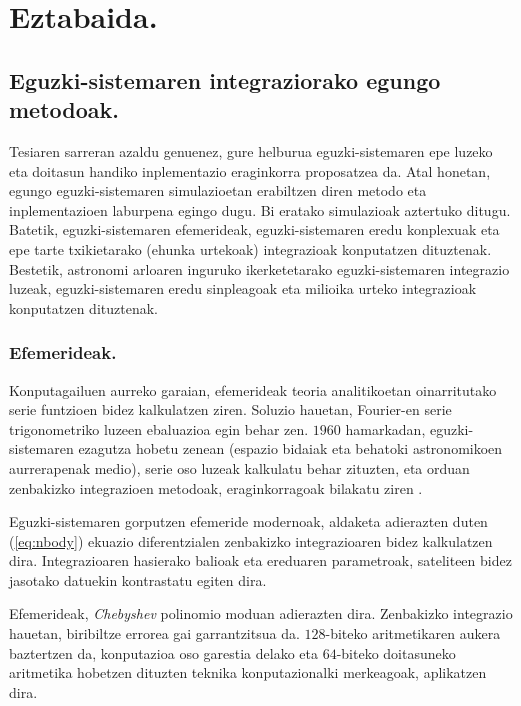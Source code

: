 \chapter{Eztabaida.}

\section{Eguzki-sistemaren integraziorako egungo metodoak.}


Tesiaren sarreran azaldu genuenez, gure helburua eguzki-sistemaren epe luzeko eta doitasun handiko inplementazio eraginkorra proposatzea da. Atal honetan, egungo eguzki-sistemaren simulazioetan erabiltzen diren metodo eta inplementazioen laburpena egingo dugu. Bi eratako simulazioak aztertuko ditugu. Batetik, eguzki-sistemaren  efemerideak, eguzki-sistemaren eredu konplexuak eta epe tarte txikietarako (ehunka urtekoak) integrazioak konputatzen dituztenak. Bestetik, astronomi arloaren inguruko ikerketetarako eguzki-sistemaren integrazio luzeak, eguzki-sistemaren eredu sinpleagoak eta milioika urteko integrazioak konputatzen dituztenak. 

\subsection*{Efemerideak.}

Konputagailuen aurreko garaian, efemerideak teoria analitikoetan oinarritutako serie funtzioen bidez kalkulatzen ziren. Soluzio hauetan, Fourier-en serie trigonometriko luzeen ebaluazioa egin behar zen. $1960$ hamarkadan, eguzki-sistemaren ezagutza hobetu zenean (espazio bidaiak eta behatoki astronomikoen aurrerapenak medio), serie oso luzeak kalkulatu behar zituzten, eta orduan zenbakizko integrazioen metodoak, eraginkorragoak bilakatu ziren \cite{Kaplan2015}.   
   
Eguzki-sistemaren gorputzen efemeride modernoak, aldaketa adierazten duten (\ref{eq:nbody})  ekuazio diferentzialen  zenbakizko integrazioaren bidez kalkulatzen dira. Integrazioaren hasierako balioak eta ereduaren parametroak, sateliteen bidez jasotako datuekin kontrastatu egiten dira.

Efemerideak, \emph{Chebyshev} polinomio moduan adierazten dira. Zenbakizko integrazio hauetan, biribiltze errorea gai garrantzitsua da. $128$-biteko aritmetikaren aukera baztertzen da, konputazioa oso garestia delako eta $64$-biteko doitasuneko aritmetika hobetzen dituzten teknika konputazionalki merkeagoak, aplikatzen dira. 

